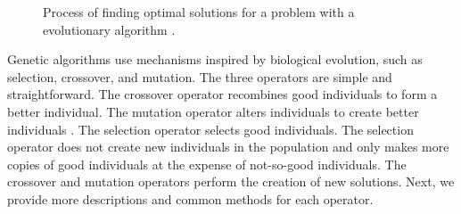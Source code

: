 \begin{figure}[htb!]
        \centering
        \caption{Process of finding optimal solutions for a problem with a 
        evolutionary algorithm \cite{renner_genetic_2003}. }
        \label{fig:genetic_alg}
\end{figure}

Genetic algorithms use mechanisms inspired by biological evolution, such as 
selection, crossover, and mutation. 
The three operators are simple and straightforward.
The crossover operator recombines good individuals to form a better 
individual. 
The mutation operator alters individuals to create better individuals
\cite{deb_multi-objective_2001}.  
The selection operator selects good individuals. 
The selection operator does not create new individuals in the population 
and only makes more copies of good individuals at the expense of not-so-good
individuals. 
The crossover and mutation operators perform the creation of new solutions.
Next, we provide more descriptions and common methods for each operator.

